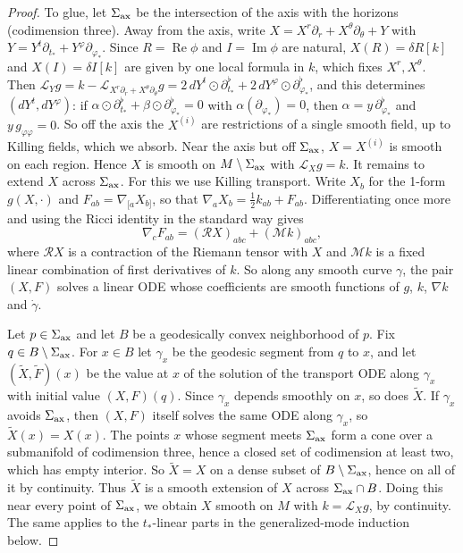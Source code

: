 \documentclass[11pt]{amsart}
\theoremstyle{definition}
\theoremstyle{remark}
\numberwithin{equation}{section}
\newcommand{\cL}{\mathcal{L}}
\renewcommand{\Im}{\operatorname{Im}}
\renewcommand{\Re}{\operatorname{Re}}
\begin{document}
\begin{proof}
To glue, let $\Sigma_{\rm ax}$ be the intersection of the axis with the horizons (codimension three). Away from the axis, write
$X=X^r\partial_r+X^\theta\partial_\theta+Y$ with $Y=Y^t\partial_{t_*}+Y^\varphi\partial_{\varphi_*}$. Since $R=\Re\phi$ and
$I=\Im\phi$ are natural, $X(R)=\delta R[k]$ and $X(I)=\delta I[k]$ are given by one local formula in $k$, which fixes
$X^r,X^\theta$. Then $\cL_Yg=k-\cL_{X^r\partial_r+X^\theta\partial_\theta}g=2\,dY^t\odot\partial_{t_*}^\flat+2\,dY^\varphi\odot\partial_{\varphi_*}^\flat$,
and this determines $(dY^t,dY^\varphi)$: if $\alpha\odot\partial_{t_*}^\flat+\beta\odot\partial_{\varphi_*}^\flat=0$ with
$\alpha(\partial_{\varphi_*})=0$, then $\alpha=y\,\partial_{\varphi_*}^\flat$ and $y\,g_{\varphi\varphi}=0$. So off the axis the
$X^{(i)}$ are restrictions of a single smooth field, up to Killing fields, which we absorb. Near the axis but off $\Sigma_{\rm ax}$,
$X=X^{(i)}$ is smooth on each region. Hence $X$ is smooth on $M\setminus \Sigma_{\rm ax}$ with $\cL_Xg=k$. It remains to extend $X$ across $\Sigma_{\rm ax}$. For this we use Killing transport. Write $X_b$ for the 1-form
$g(X,\cdot)$ and $F_{ab}=\nabla_{[a}X_{b]}$, so that $\nabla_aX_b=\frac12k_{ab}+F_{ab}$. Differentiating once more and
using the Ricci identity in the standard way gives
\[
\nabla_cF_{ab}=(\mathcal R X)_{abc}+(\mathcal Mk)_{abc},
\]
where $\mathcal R X$ is a contraction of the Riemann tensor with $X$ and $\mathcal M k$ is a fixed linear combination of first derivatives of $k$. So along any smooth curve $\gamma$,
the pair $(X,F)$ solves a linear ODE whose coefficients are smooth functions of $g$, $k$, $\nabla k$ and $\dot\gamma$.

Let $p\in\Sigma_{\rm ax}$ and let $B$ be a geodesically convex neighborhood of $p$. Fix $q\in B\setminus\Sigma_{\rm ax}$. For
$x\in B$ let $\gamma_x$ be the geodesic segment from $q$ to $x$, and let $(\tilde X,\tilde F)(x)$ be the value at $x$ of the
solution of the transport ODE along $\gamma_x$ with initial value $(X,F)(q)$. Since $\gamma_x$ depends smoothly on $x$, so
does $\tilde X$. If $\gamma_x$ avoids $\Sigma_{\rm ax}$, then $(X,F)$ itself solves the same ODE along $\gamma_x$, so
$\tilde X(x)=X(x)$. The points $x$ whose segment meets $\Sigma_{\rm ax}$ form a cone over a submanifold of codimension
three, hence a closed set of codimension at least two, which has empty interior. So $\tilde X=X$ on a dense subset of
$B\setminus\Sigma_{\rm ax}$, hence on all of it by continuity. Thus $\tilde X$ is a smooth extension of $X$ across
$\Sigma_{\rm ax}\cap B$. Doing this near every point of $\Sigma_{\rm ax}$, we obtain $X$ smooth on $M$ with $k=\cL_Xg$,
by continuity. The same applies to the
$t_*$-linear parts in the generalized-mode induction below.
\end{proof}
\end{document}
